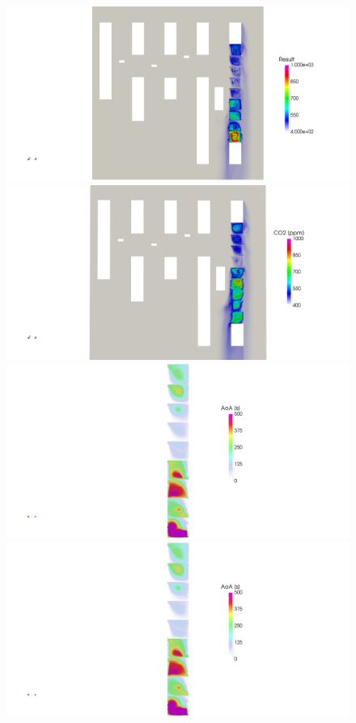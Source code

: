 \begin{figure}[!htbp]
{		\includegraphics[width=0.162\textheight, trim= 86.5cm 11.5cm 41cm 15cm, clip]{images/CO2/V1-4w/topview_CO2}}
	\includegraphics[width=0.09\textheight, trim= 112cm 5.85cm 19cm 10cm, clip]{images/CO2/V0/topview_CO2}\hspace*{0.5cm}
	\includegraphics[width=0.062\textheight, trim=65cm -8cm 68cm 0cm, clip ]{images/AoA/BRAC/V1-4w/topview_AoA4}
	\includegraphics[width=0.062\textheight, trim=90cm 7cm 45cm 0cm, clip ]{images/AoA/BRAC/V1-4w/topview_AoA4}  \\

\end{figure}

